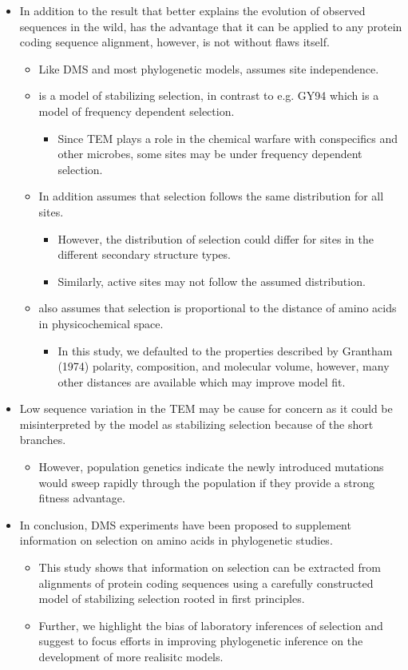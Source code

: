\documentclass[12pt]{article}
\begin{document}
\begin{itemize}
	\item In addition to the result that \selac better explains the evolution of observed sequences in the wild, \selac has the advantage that it can be applied to any protein coding sequence alignment, however, is not without flaws itself.
	\begin{itemize}
		\item Like DMS and most phylogenetic models, \selac assumes site independence.
		\item \selac is a model of stabilizing selection, in contrast to e.g. GY94 which is a model of frequency dependent selection.
		\begin{itemize}
			\item Since TEM plays a role in the chemical warfare with conspecifics and other microbes, some sites may be under frequency dependent selection.
		\end{itemize}
		\item In addition \selac assumes that selection follows the same distribution for all sites.
		\begin{itemize}
			\item However, the distribution of selection could differ for sites in the different secondary structure types.
			\item Similarly, active sites may not follow the assumed distribution.
		\end{itemize}
		\item \selac also assumes that selection is proportional to the distance of amino acids in physicochemical space. 
		\begin{itemize}
			\item In this study, we defaulted to the properties described by Grantham (1974) polarity, composition, and molecular volume, however, many other distances are available which may improve model fit.
		\end{itemize}
	\end{itemize}
	\item Low sequence variation in the TEM may be cause for concern as it could be misinterpreted by the model as stabilizing selection because of the short branches.
	\begin{itemize}
		\item However, population genetics indicate the newly introduced mutations would sweep rapidly through the population if they provide a strong fitness advantage.
	\end{itemize}
	\item In conclusion, DMS experiments have been proposed to supplement information on selection on amino acids in phylogenetic studies.
	\begin{itemize}
		\item This study shows that information on selection can be extracted from alignments of protein coding sequences using a carefully constructed model of stabilizing selection rooted in first principles.
		\item Further, we highlight the bias of laboratory inferences of selection and suggest to focus efforts in improving phylogenetic inference on the development of more realisitc models.
	\end{itemize}
\end{itemize}
\end{document}
